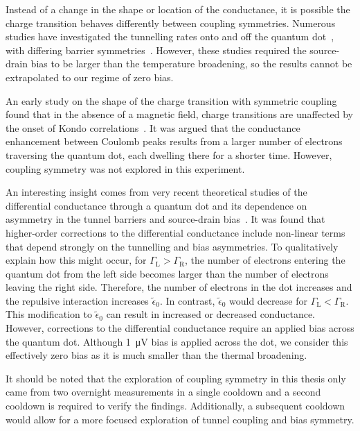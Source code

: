 Instead of a change in the shape or location of the conductance, it is possible the charge transition behaves differently between coupling symmetries. 
Numerous studies have investigated the tunnelling rates onto and off the quantum dot~\cite{MacLean2007,Ihn2009,Kng2012}, with differing barrier symmetries~\cite{Rogge2005,Gustavsson2006}. However, these studies required the source-drain bias to be larger than the temperature broadening, so the results cannot be extrapolated to our regime of zero bias. 

An early study on the shape of the charge transition with symmetric coupling found that in the absence of a magnetic field, charge transitions are unaffected by the onset of Kondo correlations~\cite{Sprinzak2002}. It was argued that the conductance enhancement between Coulomb peaks results from a larger number of electrons traversing the quantum dot, each dwelling there for a shorter time. However, coupling symmetry was not explored in this experiment. 


An interesting insight comes from very recent theoretical studies of the differential conductance through a quantum dot and its dependence on asymmetry in the tunnel barriers and source-drain bias~\cite{Tsutsumi2021,kondo_nrg_asymmetric}. 
It was found that higher-order corrections to the differential conductance include non-linear terms that depend strongly on the tunnelling and bias asymmetries. To qualitatively explain how this might occur, for $\Gamma_\mathrm{L}>\Gamma_\mathrm{R}$, the number of electrons entering the quantum dot from the left side becomes larger than the number of electrons leaving the right side. Therefore, the number of electrons in the dot increases and the repulsive interaction increases $\tilde{\epsilon}_0$. In contrast, $\tilde{\epsilon}_0$ would decrease for $\Gamma_\mathrm{L}<\Gamma_\mathrm{R}$. This modification to $\tilde{\epsilon}_0$ can result in increased or decreased conductance. However, corrections to the differential conductance require an applied bias across the quantum dot. Although \qty{1}{\micro V} bias is applied across the dot, we consider this effectively zero bias as it is much smaller than the thermal broadening. 

It should be noted that the exploration of coupling symmetry in this thesis only came from two overnight measurements in a single cooldown and a second cooldown is required to verify the findings. Additionally, a subsequent cooldown would allow for a more focused exploration of tunnel coupling and bias symmetry. 
 







